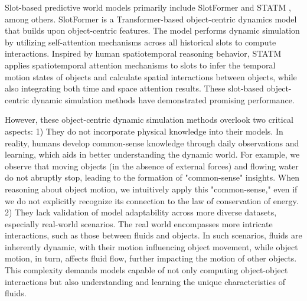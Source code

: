 \documentclass[sigconf]{acmart}
\begin{document}
Slot-based predictive world models primarily include SlotFormer \cite{wu2023SlotFormer} and STATM \cite{li2024reasoningenhanced}, among others. SlotFormer is a Transformer-based object-centric dynamics model that builds upon object-centric features. The model performs dynamic simulation by utilizing self-attention mechanisms across all historical slots to compute interactions. Inspired by human spatiotemporal reasoning behavior, STATM applies spatiotemporal attention mechanisms to slots to infer the temporal motion states of objects and calculate spatial interactions between objects, while also integrating both time and space attention results. These slot-based object-centric dynamic simulation methods have demonstrated promising performance.

However, these object-centric dynamic simulation methods  overlook two critical aspects: 1) They do not incorporate physical knowledge into their models. In reality, humans develop common-sense knowledge through daily observations and learning, which aids in better understanding the dynamic world. For example, we observe that moving objects (in the absence of external forces) and flowing water do not abruptly stop, leading to the formation of "common-sense" insights. When reasoning about object motion, we intuitively apply this "common-sense," even if we do not explicitly recognize its connection to the law of conservation of energy. 2) They lack validation of model adaptability across more diverse datasets, especially real-world scenarios. The real world encompasses more intricate interactions, such as those between fluids and objects. In such scenarios, fluids are inherently dynamic, with their motion influencing object movement, while object motion, in turn, affects fluid flow, further impacting the motion of other objects. This complexity demands models capable of not only computing object-object interactions but also understanding and learning the unique characteristics of fluids.
\end{document}
